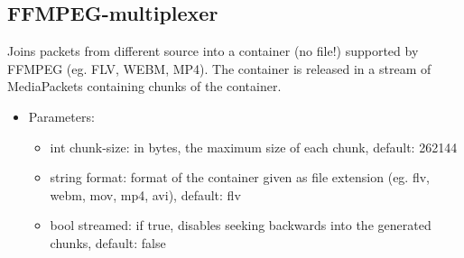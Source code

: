 \subsection{FFMPEG-multiplexer}
Joins packets from different source into a container (no file!) supported by FFMPEG (eg. FLV, WEBM, MP4). The container is released in a stream of MediaPackets containing chunks of the container.
\begin{itemize}
\item Parameters:
\begin{itemize}
\item int chunk-size: in bytes, the maximum size of each chunk, default: 262144
\item string format: format of the container given as file extension (eg. flv, webm, mov, mp4, avi), default: flv
\item bool streamed: if true, disables seeking backwards into the generated chunks, default: false
\end{itemize}
\end{itemize}
